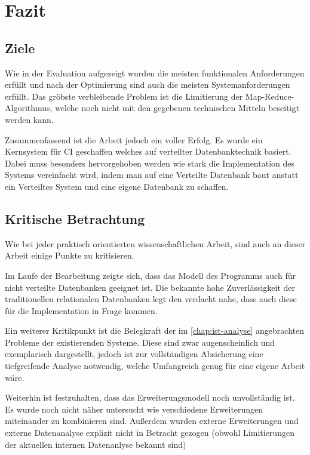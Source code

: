 \chapter{Fazit}



\section{Ziele}

Wie in der Evaluation aufgezeigt wurden die meisten funktionalen Anforderungen erfüllt und nach der Optimierung sind auch die meisten Systemanforderungen erfüllt.
Das gröbste verbleibende Problem ist die Limitierung der Map-Reduce-Algorithmus,
welche noch nicht mit den gegebenen technischen Mitteln beseitigt werden kann.

Zusammenfassend ist die Arbeit jedoch ein voller Erfolg.
Es wurde ein Kernsystem für \ac{CI} geschaffen welches auf verteilter Datenbanktechnik basiert.
Dabei muss besonders hervorgehoben werden wie stark die Implementation des Systems vereinfacht wird, indem man auf eine Verteilte Datenbank baut anstatt ein Verteiltes System und eine eigene Datenbank zu schaffen.


\section{Kritische Betrachtung}

Wie bei jeder praktisch orientierten wissenschaftlichen Arbeit,
sind auch an dieser Arbeit einige Punkte zu kritisieren.

Im Laufe der Bearbeitung zeigte sich, dass das Modell des Programms auch für
nicht verteilte Datenbanken geeignet ist.
Die bekannte hohe Zuverlässigkeit der traditionellen relationalen Datenbanken legt den verdacht nahe, dass auch diese für die Implementation in Frage kommen.

Ein weiterer Kritikpunkt ist die Belegkraft der im \cref{chap:ist-analyse} angebrachten Probleme der existierenden Systeme. Diese sind zwar augenscheinlich und exemplarisch dargestellt, jedoch ist zur vollständigen Absicherung eine tiefgreifende Analyse notwendig, welche Umfangreich genug für eine eigene Arbeit wäre.

Weiterhin ist festzuhalten, dass das Erweiterungsmodell noch unvollständig ist.
Es wurde noch nicht näher untersucht wie verschiedene Erweiterungen miteinander zu kombinieren sind. Außerdem wurden externe Erweiterungen und externe Datenanalyse explizit nicht in Betracht gezogen (obwohl Limitierungen der aktuellen internen Datenanlyse bekannt sind)


